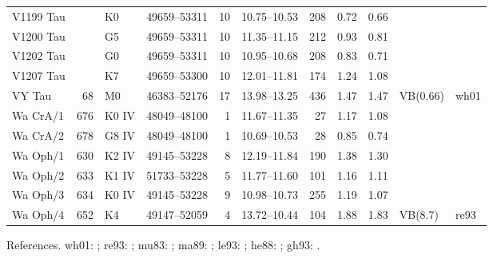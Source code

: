 \begin{table}
{\begin{tabular}{lrllrcrllll}
V1199 Tau &     & K0    & 49659--53311 & 10 & 10.75--10.53 & 208 & 0.72 & 0.66 & & \\
V1200 Tau &     & G5    & 49659--53311 & 10 & 11.35--11.15 & 212 & 0.93 & 0.81 & & \\
V1202 Tau &     & G0    & 49659--53311 & 10 & 10.95--10.68 & 208 & 0.83 & 0.71 & & \\
V1207 Tau &     & K7    & 49659--53300 & 10 & 12.01--11.81 & 174 & 1.24 & 1.08 & & \\
VY Tau    &  68 & M0    & 46383--52176 & 17 & 13.98--13.25 & 436 & 1.47 & 1.47 & VB(0.66) & wh01 \\
Wa CrA/1  & 676 & K0 IV & 48049--48100 &  1 & 11.67--11.35 &  27 & 1.17 & 1.08 & & \\
Wa CrA/2  & 678 & G8 IV & 48049--48100 &  1 & 10.69--10.53 &  28 & 0.85 & 0.74 & & \\
Wa Oph/1  & 630 & K2 IV & 49145--53228 &  8 & 12.19--11.84 & 190 & 1.38 & 1.30 & & \\
Wa Oph/2  & 633 & K1 IV & 51733--53228 &  5 & 11.77--11.60 & 101 & 1.16 & 1.11 & & \\
Wa Oph/3  & 634 & K0 IV & 49145--53228 &  9 & 10.98--10.73 & 255 & 1.19 & 1.07 & & \\
Wa Oph/4  & 652 & K4    & 49147--52059 &  4 & 13.72--10.44 & 104 & 1.88 & 1.83 & VB(8.7) & re93 \\
\hline
\end{tabular}}
\medskip
References.
wh01: \citet{white01}; re93: \citet{reipurth93}; mu83:
\citet{mundt83}; ma89: \citet{mathieu89}; le93: \citet{leinert93}; he88: \citet{herbig88}; gh93:
\citet{ghez93}.
\end{table}